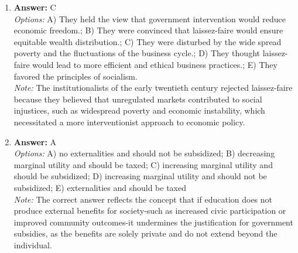 \documentclass[12pt]{article}
\begin{document}
\begin{enumerate}[label=\arabic*.]
\item \textbf{Answer:} C
\\ \textit{Options:} A) They held the view that government intervention would reduce economic freedom.; B) They were convinced that laissez-faire would ensure equitable wealth distribution.; C) They were disturbed by the wide spread poverty and the fluctuations of the business cycle.; D) They thought laissez-faire would lead to more efficient and ethical business practices.; E) They favored the principles of socialism.
\\ \textit{Note:} The institutionalists of the early twentieth century rejected laissez-faire because they believed that unregulated markets contributed to social injustices, such as widespread poverty and economic instability, which necessitated a more interventionist approach to economic policy.
\item \textbf{Answer:} A
\\ \textit{Options:} A) no externalities and should not be subsidized; B) decreasing marginal utility and should be taxed; C) increasing marginal utility and should be subsidized; D) increasing marginal utility and should not be subsidized; E) externalities and should be taxed
\\ \textit{Note:} The correct answer reflects the concept that if education does not produce external benefits for society-such as increased civic participation or improved community outcomes-it undermines the justification for government subsidies, as the benefits are solely private and do not extend beyond the individual.
\end{enumerate}
\end{document}
